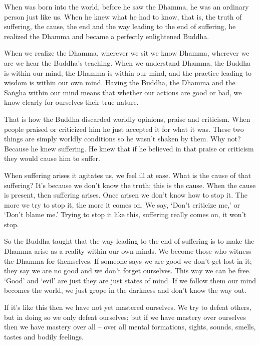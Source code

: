 When  was born into the world, before he saw the Dhamma, he was an ordinary person just like us. When he knew what he had to know, that is, the truth of suffering, the cause, the end and the way leading to the end of suffering, he realized the Dhamma and became a perfectly enlightened Buddha. 

When we realize the Dhamma, wherever we sit we know Dhamma, wher\-ever we are we hear the Buddha's teaching. When we understand Dhamma, the Buddha is within our mind, the Dhamma is within our mind, and the practice leading to wisdom is within our own mind. Having the Buddha, the Dhamma and the Sa\.ngha within our mind means that whether our actions are good or bad, we know clearly for ourselves their true nature. 

That is how the Buddha discarded worldly opinions, praise and criticism. When people praised or criticized him he just accepted it for what it was. These two things are simply worldly conditions so he wasn't shaken by them. Why not? Because he knew suffering. He knew that if he believed in that praise or criticism they would cause him to suffer. 

When suffering arises it agitates us, we feel ill at ease. What is the cause of that suffering? It's because we don't know the truth; this is the cause. When the cause is present, then suffering arises. Once arisen we don't know how to stop it. The more we try to stop it, the more it comes on. We say, `Don't criticize me,' or `Don't blame me.' Trying to stop it like this, suffering really comes on, it won't stop. 

So the Buddha taught that the way leading to the end of suffering is to make the Dhamma arise as a reality within our own minds. We become those who witness the Dhamma for themselves. If someone says we are good we don't get lost in it; they say we are no good and we don't forget ourselves. This way we can be free. `Good' and `evil' are just  they are just states of mind. If we follow them our mind becomes the world, we just grope in the darkness and don't know the way out. 

If it's like this then we have not yet mastered ourselves. We try to defeat others, but in doing so we only defeat ourselves; but if we have mastery over ourselves then we have mastery over all -- over all mental formations, sights, sounds, smells, tastes and bodily feelings. 

